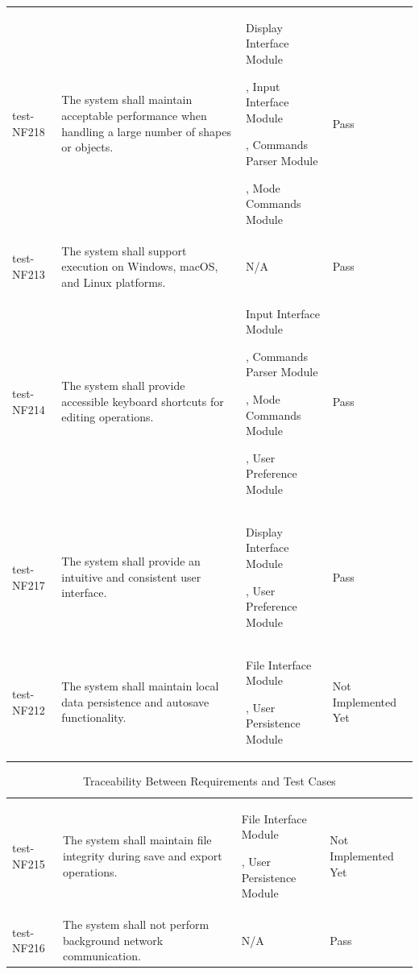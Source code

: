 \documentclass[12pt, titlepage]{article}
\begin{document}
\begin{table}[htbp]
\centering
\begin{tabular}{p{1.8cm} p{2.6cm} p{7cm} p{1.8cm}}
\toprule
test-NF218 & The system shall maintain acceptable performance when handling a large number of shapes or objects. 
& Display Interface Module

, Input Interface Module 

, Commands Parser Module

, Mode Commands Module  & Pass \\

test-NF213 & The system shall support execution on Windows, macOS, and Linux platforms. 
& N/A & Pass \\

test-NF214 & The system shall provide accessible keyboard shortcuts for editing operations. 
& Input Interface Module

, Commands Parser Module

, Mode Commands Module

, User Preference Module & Pass \\

test-NF217 & The system shall provide an intuitive and consistent user interface. 
& Display Interface Module

, User Preference Module& Pass \\

test-NF212 & The system shall maintain local data persistence and autosave functionality. 
& File Interface Module

, User Persistence Module & Not Implemented Yet \\
\end{tabular}
\end{table}
\begin{table}[htbp]
\centering
\begin{tabular}{p{1.8cm} p{2.6cm} p{7cm} p{1.8cm}}
\toprule
test-NF215 & The system shall maintain file integrity during save and export operations. 
& File Interface Module

, User Persistence Module & Not Implemented Yet \\

test-NF216 & The system shall not perform background network communication. 
& N/A & Pass \\

\bottomrule
\end{tabular}
\caption{Traceability Between Requirements and Test Cases}
\label{tab:reqTrace}
\end{table}
\end{document}
